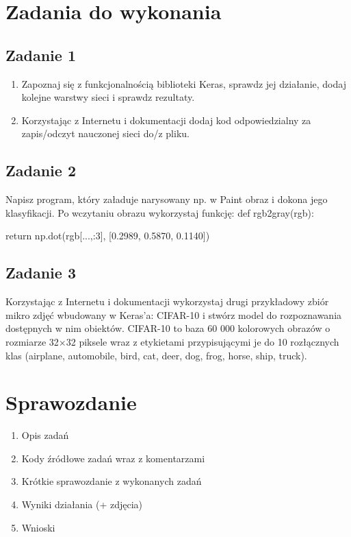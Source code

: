 \documentclass[12pt]{article}
\begin{document}
	\section{Zadania do wykonania}

	\subsection{Zadanie 1}
		\begin{enumerate}
			\item Zapoznaj się z funkcjonalnością biblioteki Keras, sprawdz jej działanie, dodaj kolejne warstwy sieci i sprawdz rezultaty.
			\item Korzystając z Internetu i dokumentacji dodaj kod odpowiedzialny za zapis/odczyt nauczonej sieci do/z pliku.
		\end{enumerate}
	
	\subsection{Zadanie 2}
		Napisz program, który załaduje narysowany np. w Paint obraz i dokona jego klasyfikacji.
		\newline
		\newline
		Po wczytaniu obrazu wykorzystaj funkcję: 
		\newline
		def rgb2gray(rgb):
			
			return np.dot(rgb[...,:3], [0.2989, 0.5870, 0.1140])
		
	\subsection{Zadanie 3}
		Korzystając z Internetu i dokumentacji wykorzystaj drugi przykładowy zbiór mikro zdjęć wbudowany w Keras'a: CIFAR-10 i stwórz model do rozpoznawania dostępnych w nim obiektów.
		\newline  CIFAR-10 to baza 60 000 kolorowych obrazów o rozmiarze 32×32 piksele wraz z etykietami przypisującymi je do 10 rozłącznych klas (airplane, automobile, bird, cat, deer, dog, frog, horse, ship, truck).
	
	\section{Sprawozdanie}
	\begin{enumerate}
		\item Opis zadań
		\item Kody źródłowe zadań wraz z komentarzami
		\item Krótkie sprawozdanie z wykonanych zadań
		\item Wyniki działania (+ zdjęcia)
		\item Wnioski
	\end{enumerate}
\end{document}
